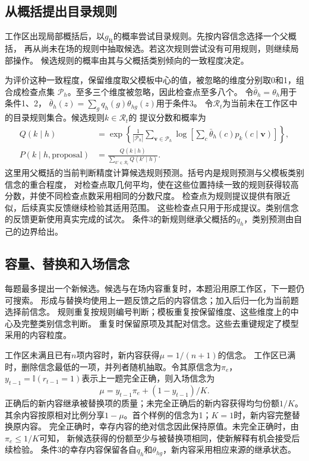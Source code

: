 \documentclass[11pt,a4paper]{article}
\numberwithin{equation}{section}
\newcommand{\ind}{\mathbb{I}}
\begin{document}
\subsection{从概括提出目录规则}
工作区出现局部概括后，以$g_{\mathrm R}$的概率尝试目录规则。先按内容信念选择一个父概括，
再从尚未在场的规则中抽取候选。若这次规则尝试没有可用规则，则继续局部操作。
候选规则的概率由其与父概括类别倾向的一致程度决定。

为评价这种一致程度，保留维度取父模板中心的值，被忽略的维度分别取0和1，组合成检查点集
$\mathcal P_h$。至多三个维度被忽略，因此检查点至多八个。
令$\bar\theta_h=\theta_h$用于条件1、2，
$\bar\theta_h(z)=\sum_gq_h(g)\theta_{hg}(z)$用于条件3。
令$\mathcal R_t$为当前未在工作区中的目录规则集合。候选规则$k\in\mathcal R_t$的
提议分数和概率为
\begin{equation}
\begin{split}
Q(k\mid h)&=\exp\!\left\{\frac1{|\mathcal P_h|}
\sum_{\bm v\in\mathcal P_h}\log\left[\sum_c\bar\theta_h(c)p_k(c\mid\bm v)\right]\right\},\\
P(k\mid h,\mathrm{proposal})&=\frac{Q(k\mid h)}{\sum_{k'\in\mathcal R_t}Q(k'\mid h)}.
\end{split}
\label{eq:proposal}
\end{equation}
这里用父概括的当前判断精度计算候选规则预测。括号内是规则预测与父模板类别信念的重合程度，
对检查点取几何平均，使在这些位置持续一致的规则获得较高分数，并使不同检查点数采用相同的分数尺度。
检查点为规则提议提供有限近似，后续真实反馈继续检验其适用范围。
这些检查点只用于形成提议。类别信念的反馈更新使用真实完成的试次。
条件3的新规则继承父概括的$q_h$，类别预测由自己的边界给出。

\subsection{容量、替换和入场信念}
每题最多提出一个新候选。候选与在场内容重复时，本题沿用原工作区，下一题仍可搜索。
形成与替换均使用上一题反馈之后的内容信念；加入后归一化为当前题选择前信念。
规则重复按规则编号判断；模板重复按保留维度、这些维度上的中心及完整类别信念判断。
重复时保留原项及其配对信念。这些去重键规定了模型采用的内容粒度。

工作区未满且已有$n$项内容时，新内容获得$\mu=1/(n+1)$的信念。
工作区已满时，删除信念最低的一项，并列者随机抽取。令其原信念为$\pi_e$，
$y_{t-1}=\ind(r_{t-1}=1)$表示上一题完全正确，则入场信念为
\begin{equation}
\mu=y_{t-1}\pi_e+(1-y_{t-1})/K.
\label{eq:admission-mass}
\end{equation}
正确后的新内容继承被替换项的质量；未完全正确后的新内容获得均匀份额$1/K$。
其余内容按原相对比例分享$1-\mu$。首个样例的信念为1；$K=1$时，新内容完整替换原内容。
完全正确时，幸存内容的绝对信念因此保持原值。未完全正确时，由$\pi_e\leq1/K$可知，
新候选获得的份额至少与被替换项相同，使新解释有机会接受后续检验。
条件3的幸存内容保留各自$q_h$和$\theta_{hg}$，新内容采用相应来源的继承状态。
\end{document}
